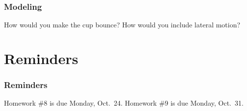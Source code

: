 \documentclass[11pt]{beamer}
\begin{document}
\begin{frame}[fragile]
  \frametitle{Modeling}
  \Enlarge

  \begin{enumerate}
  \myitem  How would you make the cup bounce? %
  \myitem  How would you include lateral motion? %
  \end{enumerate}
\end{frame}

\section{Reminders}

\begin{frame}
  \frametitle{Reminders}
  \Enlarge

  \begin{itemize}
  \myitem  Homework \#8 is due Monday, Oct.\ 24.
  \myitem  Homework \#9 is due Monday, Oct.\ 31.
  \end{itemize}
\end{frame}
\end{document}
